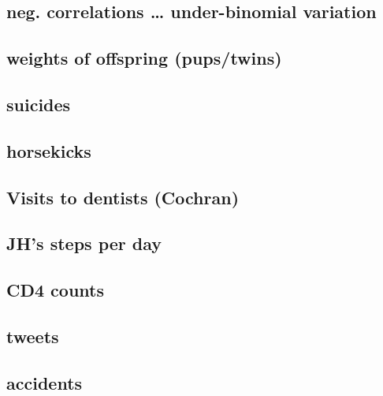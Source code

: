 \documentclass[]{book}
\begin{document}
\hypertarget{neg.-correlations-under-binomial-variation}{%
\subsection{neg. correlations \ldots{} under-binomial variation}\label{neg.-correlations-under-binomial-variation}}

\hypertarget{weights-of-offspring-pupstwins}{%
\subsection{weights of offspring (pups/twins)}\label{weights-of-offspring-pupstwins}}

\hypertarget{suicides}{%
\subsection{suicides}\label{suicides}}

\hypertarget{horsekicks}{%
\subsection{horsekicks}\label{horsekicks}}

\hypertarget{visits-to-dentists-cochran}{%
\subsection{Visits to dentists (Cochran)}\label{visits-to-dentists-cochran}}

\hypertarget{jhs-steps-per-day}{%
\subsection{JH's steps per day}\label{jhs-steps-per-day}}

\hypertarget{cd4-counts}{%
\subsection{CD4 counts}\label{cd4-counts}}

\hypertarget{tweets}{%
\subsection{tweets}\label{tweets}}

\hypertarget{accidents}{%
\subsection{accidents}\label{accidents}}
\end{document}
